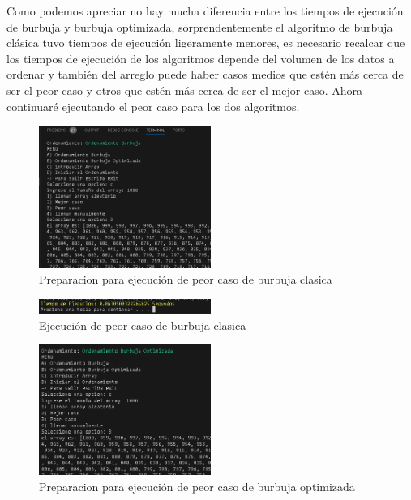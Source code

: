 \documentclass[journal]{IEEEtran}
\begin{document}
  Como podemos apreciar no hay mucha diferencia entre los 
  tiempos de ejecución de burbuja y burbuja optimizada, 
  sorprendentemente el algoritmo de burbuja clásica tuvo 
  tiempos de ejecución ligeramente menores, es necesario 
  recalcar que los tiempos de ejecución de los algoritmos 
  depende del volumen de los datos a ordenar y también del 
  arreglo puede haber casos medios que estén más cerca de 
  ser el peor caso y otros que estén más cerca de ser el 
  mejor caso. Ahora continuaré ejecutando el peor caso 
  para los dos algoritmos.
  \begin{figure}[H]
    \centering
    \begin{adjustbox}{clip=false}
      \includegraphics[width=0.5\textwidth]{20.PNG}
    \end{adjustbox}
    \caption{Preparacion para ejecución de peor caso de burbuja clasica}
  \end{figure}
  \begin{figure}[H]
    \centering
    \begin{adjustbox}{clip=false}
      \includegraphics[width=0.5\textwidth]{21.PNG}
    \end{adjustbox}
    \caption{Ejecución de peor caso de burbuja clasica}
  \end{figure}
  \begin{figure}[H]
    \centering
    \begin{adjustbox}{clip=false}
      \includegraphics[width=0.5\textwidth]{22.PNG}
    \end{adjustbox}
    \caption{Preparacion para ejecución de peor caso de burbuja optimizada}
  \end{figure}
\end{document}
